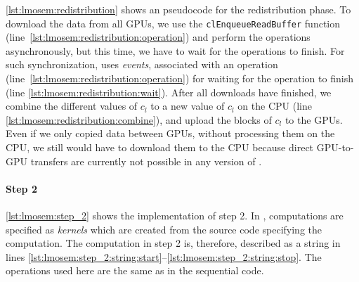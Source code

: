 \autoref{lst:lmosem:redistribution} shows an \OpenCL pseudocode for the redistribution phase.
To download the data from all GPUs, we use the \texttt{clEnqueueReadBuffer} function (line~\ref{lst:lmosem:redistribution:operation}) and perform the operations asynchronously, but this time, we have to wait for the operations to finish.
For such synchronization, \OpenCL uses \emph{events}, associated with an operation (line~\ref{lst:lmosem:redistribution:operation}) for waiting for the operation to finish (line \autoref{lst:lmosem:redistribution:wait}).
After all downloads have finished, we combine the different values of $c_l$ to a new value of $c_l$ on the CPU (line \autoref{lst:lmosem:redistribution:combine}), and upload the blocks of $c_l$ to the GPUs.
Even if we only copied data between GPUs, without processing them on the CPU, we still would have to download them to the CPU because direct GPU-to-GPU transfers are currently not possible in any version of \OpenCL.

\paragraph{Step 2}
\autoref{lst:lmosem:step_2} shows the implementation of step 2.
In \OpenCL, computations are specified as \emph{kernels} which are created from the source code specifying the computation.
The computation in step 2 is, therefore, described as a string in lines \autoref{lst:lmosem:step_2:string:start}--\autoref{lst:lmosem:step_2:string:stop}.
The operations used here are the same as in the sequential code.

